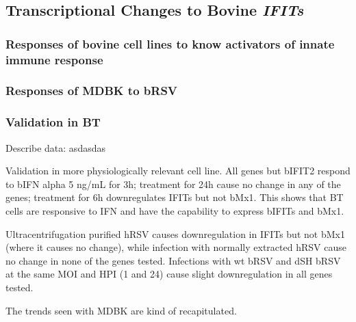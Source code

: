 \subsection{Transcriptional Changes to Bovine \textit{IFITs}}
\subsubsection{Responses of bovine cell lines to know activators of innate immune response} \label{Responses of bovine cell lines to know activators of innate immune response}


\subsubsection{Responses of MDBK to bRSV}




\subsubsection{Validation in BT} \label{Validation in BT}
Describe data: \newline
asdasdas

Validation in more physiologically relevant cell line. All genes but bIFIT2 respond to bIFN alpha 5 ng/mL for 3h; treatment for 24h cause no change in any of the genes; treatment for 6h downregulates IFITs but not bMx1. This shows that BT cells are responsive to IFN and have the capability to express bIFITs and bMx1.

Ultracentrifugation purified hRSV causes downregulation in IFITs but not bMx1 (where it causes no change), while infection with normally extracted hRSV cause no change in none of the genes tested. Infections with wt bRSV and dSH bRSV at the same MOI and HPI (1 and 24) cause slight downregulation in all genes tested.

The trends seen with MDBK are kind of recapitulated.

